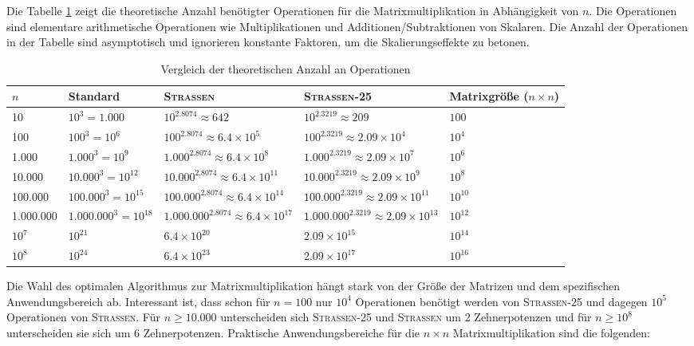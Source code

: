 \documentclass{scrartcl}
\numberwithin{equation}{section}
\begin{document}
Die Tabelle \ref{tab:operations-comparison} zeigt die theoretische Anzahl benötigter Operationen für die Matrixmultiplikation in Abhängigkeit von $n$. Die Operationen sind elementare arithmetische Operationen wie Multiplikationen und Additionen/Subtraktionen von Skalaren. Die Anzahl der Operationen in der Tabelle sind asymptotisch und ignorieren konstante Faktoren, um die Skalierungseffekte zu betonen.
\begin{table}[h]
	\centering
	\caption{Vergleich der theoretischen Anzahl an Operationen}
	\label{tab:operations-comparison}
	\renewcommand{\arraystretch}{1.5} %
	\begin{tabular}{m{1.5cm}|m{3cm}|m{3cm}|m{3cm}|m{2cm}}
		\hline
		$n$ & Standard & \textsc{Strassen} & \textsc{Strassen-25} & Matrixgröße ($n \times n$) \\
		\hline\hline
		10 & $10^3 = 1.000$ & $10^{2.8074} \approx 642$ & $10^{2.3219} \approx 209$ & $100$ \\
		\hline
		100 & $100^3 = 10^6$ & $100^{2.8074} \approx 6.4 \times 10^5$ & $100^{2.3219} \approx 2.09 \times 10^4$ & $10^4$ \\
		\hline
		1.000 & $1.000^3 = 10^9$ & $1.000^{2.8074} \approx 6.4 \times 10^8$ & $1.000^{2.3219} \approx 2.09 \times 10^7$ & $10^6$ \\
		\hline
		10.000 & $10.000^3 = 10^{12}$ & $10.000^{2.8074} \approx 6.4 \times 10^{11}$ & $10.000^{2.3219} \approx 2.09 \times 10^{9}$ & $10^8$ \\
		\hline
		100.000 & $100.000^3 = 10^{15}$ & $100.000^{2.8074} \approx 6.4 \times 10^{14}$ & $100.000^{2.3219} \approx 2.09 \times 10^{11}$ & $10^{10}$ \\
		\hline
		1.000.000 & $1.000.000^3 = 10^{18}$ & $1.000.000^{2.8074} \approx 6.4 \times 10^{17}$ & $1.000.000^{2.3219} \approx 2.09 \times 10^{13}$ & $10^{12}$ \\
		\hline
		$10^7$ & $10^{21}$ & $6.4 \times 10^{20}$ & $2.09 \times 10^{15}$ & $10^{14}$ \\
		\hline
		$10^8$ & $10^{24}$ & $6.4 \times 10^{23}$ & $2.09 \times 10^{17}$ & $10^{16}$ \\
		\hline
	\end{tabular}
\end{table}
Die Wahl des optimalen Algorithmus zur Matrixmultiplikation hängt stark von der Größe der Matrizen und dem spezifischen Anwendungsbereich ab. Interessant ist, dass schon für $n = 100$ nur $10^{4}$ Operationen benötigt werden von \textsc{Strassen-25} und dagegen $10^{5}$ Operationen von \textsc{Strassen}. Für $n \geq 10.000$ unterscheiden sich \textsc{Strassen-25} und \textsc{Strassen} um 2 Zehnerpotenzen und für $n \geq 10^8$ unterscheiden sie sich um 6 Zehnerpotenzen. Praktische Anwendungsbereiche für die $n \times n$ Matrixmultiplikation sind die folgenden:
\end{document}
